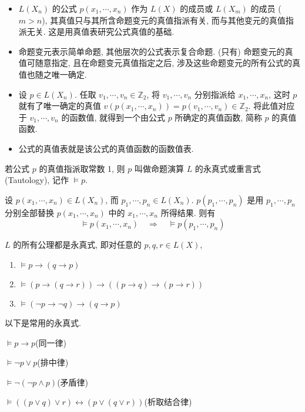 \documentclass[
    color=black,
    device=normal,
    lang=cn
]{elegantnote}
\begin{document}
\begin{itemize}
    \item $L(X_n)$ 的公式 $p(x_1,\cdots,x_n)$ 作为 $L(X)$ 的成员或 $L(X_m)$ 的成员 ($m>n$), 其真值只与其所含命题变元的真值指派有关, 而与其他变元的真值指派无关. 这是用真值表研究公式真值的基础.
    \item 命题变元表示简单命题, 其他层次的公式表示复合命题. (只有) 命题变元的真值可随意指定, 且在命题变元真值指定之后, 涉及这些命题变元的所有公式的真值也随之唯一确定.
    \item 设 $p\in L(X_n)$. 任取 $v_1, \cdots, v_n \in\mathbb{Z}_2$, 将 $v_1, \cdots, v_n$ 分别指派给 $x_1, \cdots, x_n$, 这时 $p$ 就有了唯一确定的真值 $v(p(x_1,\cdots,x_n))=p(v_1,\cdots,v_n)\in\mathbb{Z}_2$. 将此值对应于 $v_1, \cdots, v_n$ 的函数值, 就得到一个由公式 $p$ 所确定的真值函数, 简称 $p$ 的真值函数.
    \item 公式的真值表就是该公式的真值函数的函数值表.
\end{itemize}
\begin{definition}[永真式]
    若公式 $p$ 的真值指派取常数 1, 则 $p$ 叫做命题演算 $L$ 的永真式或重言式 (Tautology), 记作 $\vDash p$.
\end{definition}
\begin{theorem}[代换定理]
    设 $p(x_1, \cdots, x_n)\in L(X_n)$, 而 $p_1, \cdots, p_n\in L(X_n)$. $p(p_1, \cdots, p_n)$ 是用 $p_1,\cdots,p_n$ 分别全部替换 $p(x_1,\cdots,x_n)$ 中的 $x_1, \cdots, x_n$ 所得结果. 则有
    $$
        \vDash p(x_1, \cdots, x_n)\quad\Rightarrow\quad \vDash p(p_1,\cdots,p_n)
    $$
\end{theorem}
\begin{proposition}
    $L$ 的所有公理都是永真式, 即对任意的 $p,q,r\in L(X)$,
    \begin{enumerate}[label = $\arabic*^\circ$, topsep = -1em]
        \item $\vDash p\to(q\to p)$
        \item $\vDash (p\to (q\to r))\to ((p\to q)\to (p\to r))$
        \item $\vDash (\lnot p\to \lnot q)\to (q\to p)$
    \end{enumerate}
\end{proposition}

以下是常用的永真式.

$\vDash p\to p$\hfill(同一律)

$\vDash \lnot p\lor p$\hfill(排中律)

$\vDash \lnot(\lnot p\land p)$\hfill(矛盾律)

$\vDash ((p\lor q)\lor r)\leftrightarrow(p\lor(q\lor r))$\hfill(析取结合律)
\end{document}
